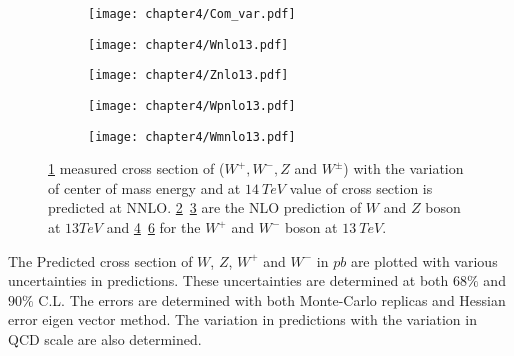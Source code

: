\documentclass[a4paper,12pt]{report}
\numberwithin{equation}{section}
\begin{document}
\begin{figure}[H]
\centering
\begin{subfigure}{\textwidth}
\texttt{[image: chapter4/Com\_var.pdf]}
\vspace*{-4mm}
\caption{}
\label{com_var}
\end{subfigure}
\begin{subfigure}{0.49\textwidth}
\texttt{[image: chapter4/Wnlo13.pdf]}
\vspace*{-6mm}
\caption{}
\label{wnlo}

\end{subfigure}
\begin{subfigure}{0.49\textwidth}
\texttt{[image: chapter4/Znlo13.pdf]}
\vspace*{-6mm}
\caption{}
\label{znlo}
\end{subfigure}
\begin{subfigure}{0.49\textwidth}
\texttt{[image: chapter4/Wpnlo13.pdf]}
\vspace*{-6mm}
\caption{}
\label{wpnlo}
\end{subfigure}
\begin{subfigure}{0.49\textwidth}
\texttt{[image: chapter4/Wmnlo13.pdf]}
\vspace*{-6mm}
\caption{}
\label{wmnlo}
\end{subfigure}
\caption{\ref{com_var} measured cross section of ($W^{+},W^{-},Z$ and $W^{\pm}$) with the variation of center of mass energy and at $14~TeV$ value of cross section is predicted at NNLO. \ref{wnlo}~\ref{znlo} are the NLO prediction of $W$ and $Z$ boson at $13TeV$ and \ref{wpnlo}~\ref{wmnlo} for the $W^{+}$ and $W^{-}$ boson at $13~TeV$.}
\end{figure}
The Predicted cross section of $W$, $Z$, $W^{+}$ and $W^{-}$ in $pb$ are plotted with various uncertainties in predictions. These uncertainties are determined at both $68\%$ and $90\%$ C.L. The errors are determined with both Monte-Carlo replicas and Hessian error eigen vector method. The variation in predictions with the variation in QCD scale are also determined.
\end{document}
